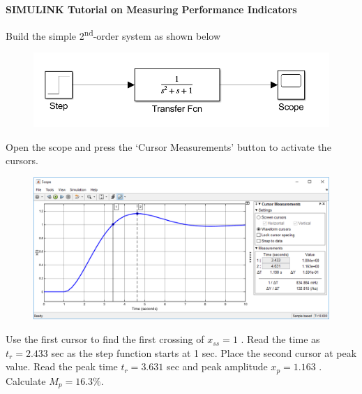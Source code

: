 \documentclass[12pt,letter]{article}
\begin{document}
\begin{example}

\textbf{SIMULINK Tutorial on Measuring Performance Indicators}

Build the simple 2\textsuperscript{nd}-order system as shown below
\begin{figure}[H]
	\centering
	\includegraphics[width=4.5in]{../figures/Simulink_step_model_transfer_2nd_oder}
\end{figure}
Open the scope and press the `Cursor Measurements' button to activate the cursors.

\begin{figure}[H]
	\centering
	\includegraphics[width=6.0in]{../figures/Simulink_step_model_transfer_cursor_measurements_2nd_oder}
\end{figure}

Use the first cursor to find the first crossing of $x_{ss} = 1$ . Read the time as $t_r = 2.433$ sec as the step function starts at 1 sec. Place the second cursor at peak value. Read the peak time $t_r = 3.631$ sec and peak amplitude
$x_p = 1.163$ . Calculate $M_p = 16.3\%$.

\end{example}


	\pagebreak
	\renewcommand{\thepage}{}
	\renewcommand\refname{References Cited}
	\pagestyle{plain}
	
	
\end{document}
